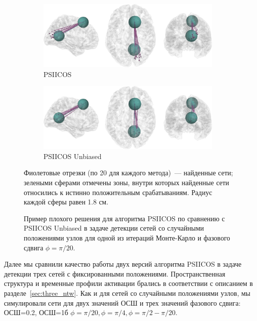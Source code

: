 \begin{figure}[htbp]
    \begin{subfigure}[t]{0.5\textwidth}
        \includegraphics[width=0.99\textwidth]{../images/bias_brain_PSIICOS.jpg}
        \caption{PSIICOS}\label{fig:bias_brain_psiicos}
    \end{subfigure}
    \begin{subfigure}[t]{0.5\textwidth}
        \includegraphics[width=0.99\textwidth]{../images/bias_brain_PSIICOS_Unbiased.jpg}
        \caption{PSIICOS Unbiased}\label{fig:bias_brain_psiicos_unbiased}
    \end{subfigure}
    \caption{Пример плохого решения для алгоритма PSIICOS по сравнению с
        PSIICOS Unbiased в задаче детекции сетей со случайными положениями
        узлов для одной из итераций Монте-Карло и фазового сдвига
        $\phi=\pi/20$.
    }\label{fig:psiicos_vs_unbiased_case_3dbrain}
    Фиолетовые отрезки (по 20 для каждого метода)~--- найденные сети; зелеными
    сферами отмечены зоны, внутри которых найденные сети относились к истинно
    положительным срабатываниям. Радиус каждой сферы равен 1.8 см.
\end{figure}

Далее мы сравнили качество работы двух версий алгоритма PSIICOS в задаче детекции трех
сетей с фиксированными положениями. Пространственная структура и временные профили активации
брались в соответствии с описанием в разделе~\ref{sec:three_ntw}. Как и для сетей со
случайными положениями узлов, мы симулировали сети для двух значений ОСШ и трех
значений фазового сдвига: ОСШ=0.2, ОСШ=1б $\phi=\pi/20, \phi=\pi/4, \phi=\pi/2 - \pi/20$.

